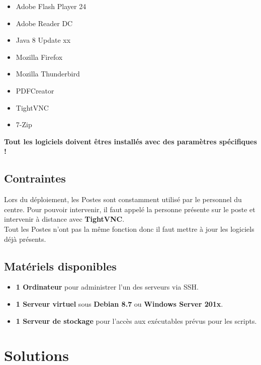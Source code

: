 \documentclass[11pt,a4paper,oneside]{article}
\begin{document}
\begin{itemize}
	\item Adobe Flash Player 24
	\item Adobe Reader DC
	\item Java 8 Update xx
	\item Mozilla Firefox
	\item Mozilla Thunderbird
	\item PDFCreator
	\item TightVNC
	\item 7-Zip
\end{itemize}

\begin{center}
\textbf{Tout les logiciels doivent êtres installés avec des paramètres spécifiques !}
\end{center}
\subsection{Contraintes}
Lors du déploiement, les Postes sont constamment utilisé par le personnel du centre. Pour pouvoir intervenir, il faut appelé la personne présente sur le poste et intervenir à distance avec \textbf{TightVNC}.\\

Tout les Postes n'ont pas la même fonction donc il faut mettre à jour les logiciels déjà présents.

\subsection{Matériels disponibles}
\begin{itemize}
	\item \textbf{1 Ordinateur} pour administrer l'un des serveurs via SSH.
	\item \textbf{1 Serveur virtuel} sous \textbf{Debian 8.7} ou \textbf{Windows Server 201x}.
	\item \textbf{1 Serveur de stockage} pour l'accès aux exécutables prévus pour les scripts. 
\end{itemize}
\newpage

\section{Solutions}
\end{document}
